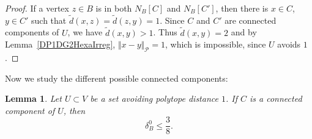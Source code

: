 \documentclass{amsart}                     %
\newtheorem{lemm}{Lemma}
\newcommand{\lref}[1]{Lemma~\textup{\ref{#1}}}
\begin{document}
\begin{proof}
If a vertex $z\in B$ is in both $N_B[C]$ and $N_B[C']$, then there is $x\in C$, $y\in C'$ such that $\tilde{d}(x,z)=\tilde{d}(z,y)=1$. Since $C$ and $C'$ are connected components of $U$, we have $\tilde{d}(x,y)>1$. Thus $\tilde{d}(x,y)=2$ and by  \lref{DP1DG2HexaIrreg}, $\Vert  x-y\Vert  _\mathcal{P}=1$, which is impossible, since $U$ avoids $1$. 
\end{proof}

Now we study the different possible connected components:

\begin{lemm}\label{HexaIrregDelta}
Let $U\subset V$ be a set avoiding polytope distance $1$. If $C$ is a connected component of $U$, then
$$ \delta^0_B\leq \frac{3}{8}. $$
\end{lemm}
\end{document}
